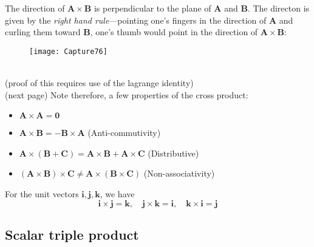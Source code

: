 \documentclass{report}
\begin{document}
The direction of $\mathbf{A\times B}$ is perpendicular to the plane of $\mathbf{A}$ and $\mathbf{B}$. 
The directon is given by the \textit{right hand rule}---pointing one's fingers in the direction of 
$\mathbf{A}$ and curling them toward $\mathbf{B}$, one's thumb would point in the direction of 
$\mathbf{A\times B}$:
\begin{figure}[h]
\texttt{[image: Capture76]}\\
\centering
\end{figure}\\
(proof of this requires use of the lagrange identity)\\
(next page)
\newpage
\noindent Note therefore, a few properties of the cross product:
\begin{itemize}
\item $\mathbf{A\times A=0}$
\item $\mathbf{A\times B=-B\times A}$ (Anti-commutivity)
\item $\mathbf{A\times(B+C)=A\times B+A\times C}$
(Distributive)
\item $\mathbf{(A\times B)\times C\neq A\times(B\times C)}$ (Non-associativity)
\end{itemize}
For the unit vectors $\mathbf{i,j,k}$, we have
\begin{equation*}
\mathbf{i\times j=k,\quad j\times k=i,\quad k\times i=j}
\end{equation*}
\newpage

\subsection{Scalar triple product}




\newpage
\end{document}
